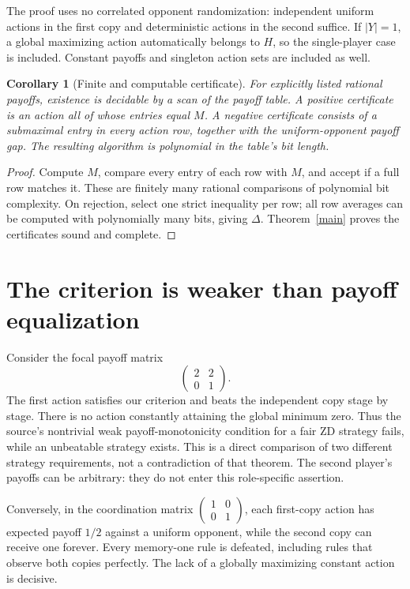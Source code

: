 \documentclass[11pt]{article}
\newtheorem{corollary}[theorem]{Corollary}
\theoremstyle{remark}
\begin{document}
The proof uses no correlated opponent randomization: independent uniform actions in the first copy and deterministic actions in the second suffice. If $|Y|=1$, a global maximizing action automatically belongs to $H$, so the single-player case is included. Constant payoffs and singleton action sets are included as well.

\begin{corollary}[Finite and computable certificate]
For explicitly listed rational payoffs, existence is decidable by a scan of the payoff table. A positive certificate is an action all of whose entries equal $M$. A negative certificate consists of a submaximal entry in every action row, together with the uniform-opponent payoff gap. The resulting algorithm is polynomial in the table's bit length.
\end{corollary}
\begin{proof}
Compute $M$, compare every entry of each row with $M$, and accept if a full row matches it. These are finitely many rational comparisons of polynomial bit complexity. On rejection, select one strict inequality per row; all row averages can be computed with polynomially many bits, giving $\Delta$. Theorem~\ref{main} proves the certificates sound and complete.
\end{proof}

\section{The criterion is weaker than payoff equalization}
Consider the focal payoff matrix
\[
 \begin{pmatrix}2&2\\0&1\end{pmatrix}.
\]
The first action satisfies our criterion and beats the independent copy stage by stage. There is no action constantly attaining the global minimum zero. Thus the source's nontrivial weak payoff-monotonicity condition for a fair ZD strategy fails, while an unbeatable strategy exists. This is a direct comparison of two different strategy requirements, not a contradiction of that theorem. The second player's payoffs can be arbitrary: they do not enter this role-specific assertion.

Conversely, in the coordination matrix $\left(\begin{smallmatrix}1&0\\0&1\end{smallmatrix}\right)$, each first-copy action has expected payoff $1/2$ against a uniform opponent, while the second copy can receive one forever. Every memory-one rule is defeated, including rules that observe both copies perfectly. The lack of a globally maximizing constant action is decisive.
\end{document}
